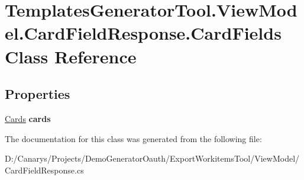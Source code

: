 \hypertarget{class_templates_generator_tool_1_1_view_model_1_1_card_field_response_1_1_card_fields}{}\section{Templates\+Generator\+Tool.\+View\+Model.\+Card\+Field\+Response.\+Card\+Fields Class Reference}
\label{class_templates_generator_tool_1_1_view_model_1_1_card_field_response_1_1_card_fields}
\subsection*{Properties}
\begin{DoxyCompactItemize}
\item 
\mbox{\label{class_templates_generator_tool_1_1_view_model_1_1_card_field_response_1_1_card_fields_a681969513afc056bd466c003611a0e02}} 
\mbox{\hyperlink{class_templates_generator_tool_1_1_view_model_1_1_card_field_response_1_1_cards}{Cards}} {\bfseries cards}
\end{DoxyCompactItemize}


The documentation for this class was generated from the following file\+:\begin{DoxyCompactItemize}
\item 
D\+:/\+Canarys/\+Projects/\+Demo\+Generator\+Oauth/\+Export\+Workitems\+Tool/\+View\+Model/Card\+Field\+Response.\+cs\end{DoxyCompactItemize}
